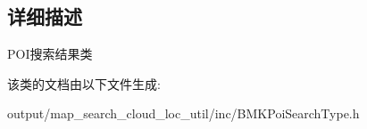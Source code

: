 \subsection{详细描述}
P\+O\+I搜索结果类 

该类的文档由以下文件生成\+:\begin{DoxyCompactItemize}
\item 
output/map\+\_\+search\+\_\+cloud\+\_\+loc\+\_\+util/inc/B\+M\+K\+Poi\+Search\+Type.\+h\end{DoxyCompactItemize}
